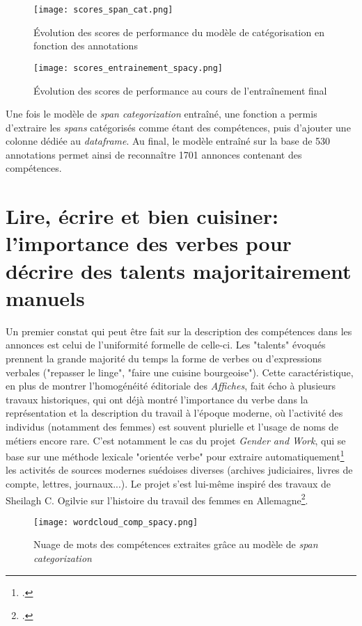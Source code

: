 \begin{figure}[ht]
	\centering
	\texttt{[image: scores\_span\_cat.png]}
	\caption{Évolution des scores de performance du modèle de catégorisation en fonction des annotations}
\end{figure}

\begin{figure}[ht]
	\centering
	\texttt{[image: scores\_entrainement\_spacy.png]}
	\caption{Évolution des scores de performance au cours de l'entraînement final}
\end{figure}

Une fois le modèle de \textit{span categorization} entraîné, une fonction a permis d'extraire les \textit{spans} catégorisés comme étant des compétences, puis d'ajouter une colonne dédiée au \textit{dataframe}. Au final, le modèle entraîné sur la base de 530 annotations permet ainsi de reconnaître 1701 annonces contenant des compétences.

\section{Lire, écrire et bien cuisiner: l'importance des verbes pour décrire des talents majoritairement manuels}

Un premier constat qui peut être fait sur la description des compétences dans les annonces est celui de l'uniformité formelle de celle-ci.  Les "talents" évoqués prennent la grande majorité du temps la forme de verbes ou d'expressions verbales ("repasser le linge", "faire une cuisine bourgeoise"). Cette caractéristique, en plus de montrer l'homogénéité éditoriale des \textit{Affiches}, fait écho à plusieurs travaux historiques, qui ont déjà montré l'importance du verbe dans la représentation et la description du travail à l'époque moderne, où l'activité des individus (notamment des femmes) est souvent plurielle et l'usage de noms de métiers encore rare. C'est notamment le cas du projet \textit{Gender and Work}, qui se base sur une méthode lexicale "orientée verbe" pour extraire automatiquement\footcites{petterssonParsingIdentificationVerb2012} les activités de sources modernes suédoises diverses (archives judiciaires, livres de compte, lettres, journaux...). Le projet s'est lui-même inspiré des travaux de Sheilagh C. Ogilvie sur l'histoire du travail des femmes en Allemagne\footcites{ogilvieBitterLivingWomen2003}. 

\begin{figure}[h]
	\centering
	\texttt{[image: wordcloud\_comp\_spacy.png]}
	\caption{Nuage de mots des compétences extraites grâce au modèle de \textit{span categorization}}
\end{figure}


